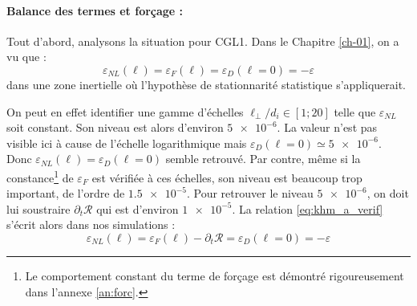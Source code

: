 \paragraph{Balance des termes et forçage :  } 

Tout d'abord, analysons la situation pour CGL1. Dans le Chapitre \ref{ch-01}, on a vu que : 
\begin{equation}
    \label{eq:khm_a_verif} \varepsilon_{NL}(\boldsymbol{\ell})  = \varepsilon_{F}(\boldsymbol{\ell}) = \varepsilon_{D}(\boldsymbol{\ell} = 0) = - \varepsilon
\end{equation}
 dans une zone inertielle où l'hypothèse de stationnarité statistique s'appliquerait. 
 
 On peut en effet identifier une gamme d'échelles $\ell_{\perp}/d_i \in \left[ \num{1}; \num{20}\right]$ telle que $\varepsilon_{NL}$ soit constant. Son niveau est alors d'environ $\num{5e-6}$. La valeur n'est pas visible ici à cause de l'échelle logarithmique mais $\varepsilon_{D}(\boldsymbol{\ell} = 0) \simeq \num{5e-6}$. Donc $\varepsilon_{NL}(\boldsymbol{\ell})  =  \varepsilon_{D}(\boldsymbol{\ell} = 0)$ semble retrouvé. Par contre, même si la constance\footnote{ Le comportement constant du terme de forçage est démontré rigoureusement dans l'annexe \ref{an:forc}.} de $\varepsilon_{F}$ est vérifiée à ces échelles, son niveau est beaucoup trop important, de l'ordre de $ \num{1.5e-5}$. Pour retrouver le niveau $\num{5e-6}$, on doit lui soustraire $\partial_t \mathcal{R}$ qui est d'environ $ \num{1e-5}$. La relation \eqref{eq:khm_a_verif} s'écrit alors dans nos simulations : 
 \begin{equation}
    \label{eq:khm_b_verif} \varepsilon_{NL}(\boldsymbol{\ell})  = \varepsilon_{F}(\boldsymbol{\ell}) - \partial_t \mathcal{R} = \varepsilon_{D}(\boldsymbol{\ell} = 0) = - \varepsilon
\end{equation}

